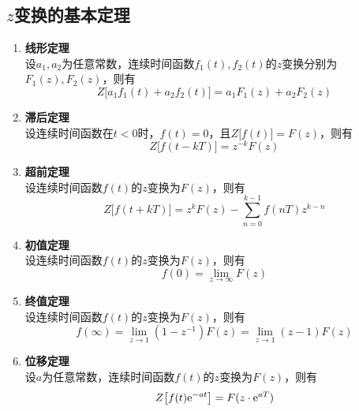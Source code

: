 \subsection{$z$变换的基本定理}
\begin{enumerate}
	\item \textbf{线形定理}\\
	设$a_1,a_2$为任意常数，连续时间函数$f_1(t),f_2(t)$的$z$变换分别为$F_1(z),F_2(z)$，则有
	\begin{equation}
		Z\big[a_1f_1(t) + a_2f_2(t) \big] = a_1F_1(z)+a_2F_2(z)
	\end{equation}
	
	\item \textbf{滞后定理}\\
	设连续时间函数在$t < 0$时，$f(t) = 0$，且$Z\big[f(t)\big] = F(z)$，则有
	\begin{equation}
		Z\big[f(t-kT)\big] = z^{-k}F(z)
	\end{equation}
	
	\item \textbf{超前定理}\\
	设连续时间函数$f(t)$的$z$变换为$F(z)$，则有
	\begin{equation}
		Z\big[f(t+kT)\big] = z^kF(z) - \sum_{n = 0}^{k - 1} f(nT)z^{k-n}
	\end{equation}
	
	\item \textbf{初值定理}\\
	设连续时间函数$f(t)$的$z$变换为$F(z)$，则有
	\begin{equation}
		f(0) = \lim\limits_{z \to \infty} F(z)
	\end{equation}
	
	\item \textbf{终值定理}\\
	设连续时间函数$f(t)$的$z$变换为$F(z)$，则有
	\begin{equation}
		f(\infty) = \lim\limits_{z \to 1} (1 - z^{-1})F(z) = \lim\limits_{z \to 1}(z - 1)F(z)
	\end{equation}
	
	\item \textbf{位移定理}\\
	设$a$为任意常数，连续时间函数$f(t)$的$z$变换为$F(z)$，则有
	\begin{equation}
		Z\big[f(t){\rm{e}}^{-at}\big] = F(z\cdot {\rm{e}}^{aT})
	\end{equation}
\end{enumerate}

